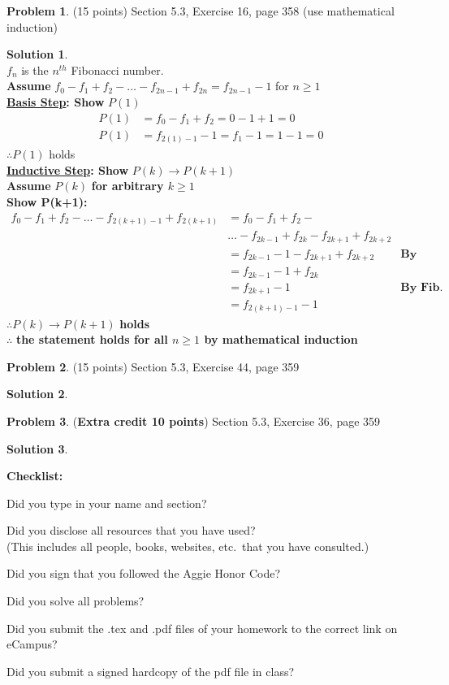 \documentclass{article}
\theoremstyle{definition}
\newtheorem{problem}{Problem}
\newtheorem*{solution}{Solution}
\newcommand{\checklist}{\noindent\textbf{Checklist:}
\begin{compactitem}[$\Box$] 
\item Did you type in your name and section? 
\item Did you disclose all resources that you have used? \\
(This includes all people, books, websites, etc.\ that you have consulted.)
\item Did you sign that you followed the Aggie Honor Code? 
\item Did you solve all problems? 
\item Did you submit the .tex and .pdf files of your homework to the correct link on eCampus?
\item Did you submit a signed hardcopy of the pdf file in class? 
\end{compactitem}
}
\begin{document}
\begin{problem} (15 points)
Section 5.3, Exercise 16, page 358 (use mathematical induction)
\end{problem}
\begin{solution}  \ \\
$f_n$ is the $n^{th}$ Fibonacci number. \\
\textbf{Assume} $f_0 - f_1 + f_2 - \dots - f_{2n-1} + f_{2n} = f_{2n-1} - 1 $ for $n\ge 1$ \\
\textbf{\underline{Basis Step}: Show }$P(1)$ \\
\begin{align*}
P(1) &= f_0 - f_1 + f_2 = 0 - 1 + 1 = 0 \\
P(1) &= f_{2(1) - 1} - 1 = f_1 - 1 = 1 - 1 = 0
\end{align*}
$\therefore P(1)$ holds \\
\textbf{\underline{Inductive Step}: Show } $P(k) \rightarrow P(k+1)$ \\
\textbf{Assume} $P(k)$ \textbf{for arbitrary $k \ge  1$} \\
\textbf{Show P(k+1):} \\
\begin{align*}
  f_0 - f_1 + f_2 - \dots - f_{2(k+1)-1} + f_{2(k+1)} &= f_0 - f_1 + f_2 - \\
  & \dots - f_{2k-1} + f_{2k} - f_{2k+1} + f_{2k+2} \\
  &= f_{2k-1} - 1 - f_{2k+1} + f_{2k+2} &\textbf{By Inductive Hypothesis}\\
  &= f_{2k-1} - 1 + f_{2k} \\
  &= f_{2k+1} - 1 &\textbf{By Fib.}\\
  &= f_{2(k+1) - 1} - 1
\end{align*}
$\therefore P(k) \rightarrow P(k+1)$ \textbf{holds}\\
$\therefore$ \textbf{the statement holds for all $n \ge 1 $ by mathematical induction}
\end{solution}

\begin{problem} (15 points)
Section 5.3, Exercise 44, page 359
\end{problem}
\begin{solution} 
\end{solution}

\begin{problem} (\textbf{Extra credit 10 points})
Section 5.3, Exercise 36, page 359
\end{problem}
\begin{solution} 
\end{solution}

\goodbreak
\checklist
\end{document}
